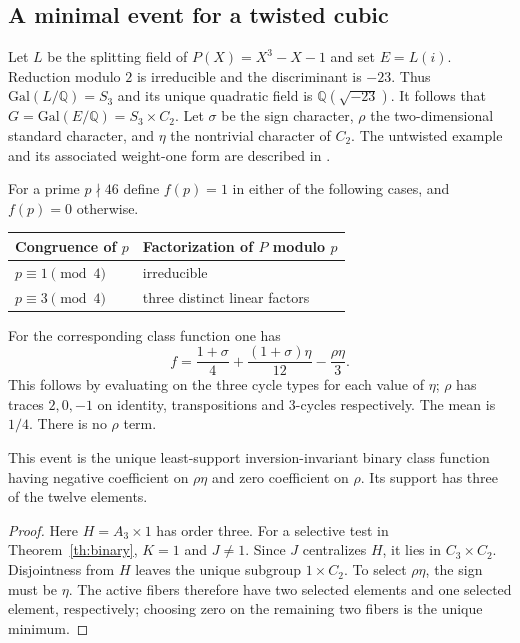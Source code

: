 \subsection{A minimal event for a twisted cubic}
Let $L$ be the splitting field of $P(X)=X^3-X-1$ and set $E=L(i)$. Reduction modulo $2$ is irreducible and the discriminant is $-23$. Thus $\mathrm{Gal}(L/\mathbb Q)=S_3$ and its unique quadratic field is $\mathbb Q(\sqrt{-23})$. It follows that $G=\mathrm{Gal}(E/\mathbb Q)=S_3\times C_2$. Let $\sigma$ be the sign character, $\rho$ the two-dimensional standard character, and $\eta$ the nontrivial character of $C_2$. The untwisted example and its associated weight-one form are described in \cite{serrepoly,ng}.

For a prime $p\nmid46$ define $f(p)=1$ in either of the following cases, and $f(p)=0$ otherwise.
\begin{center}
\begin{tabular}{@{}ll@{}}\toprule
Congruence of $p$ & Factorization of $P$ modulo $p$ \\\midrule
$p\equiv1\pmod4$ & irreducible \\
$p\equiv3\pmod4$ & three distinct linear factors \\\bottomrule
\end{tabular}
\end{center}
For the corresponding class function one has
\begin{equation}\label{eq:identity}
          f=\frac{1+\sigma}{4}+\frac{(1+\sigma)\eta}{12}
                      -\frac{\rho\eta}{3}.
\end{equation}
This follows by evaluating on the three cycle types for each value of $\eta$; $\rho$ has traces $2,0,-1$ on identity, transpositions and 3-cycles respectively. The mean is $1/4$. There is no $\rho$ term.

\begin{corollary}
This event is the unique least-support inversion-invariant binary class function having negative coefficient on $\rho\eta$ and zero coefficient on $\rho$. Its support has three of the twelve elements.
\end{corollary}
\begin{proof}
Here $H=A_3\times1$ has order three. For a selective test in Theorem~\ref{th:binary}, $K=1$ and $J\ne1$. Since $J$ centralizes $H$, it lies in $C_3\times C_2$. Disjointness from $H$ leaves the unique subgroup $1\times C_2$. To select $\rho\eta$, the sign must be $\eta$. The active fibers therefore have two selected elements and one selected element, respectively; choosing zero on the remaining two fibers is the unique minimum.
\end{proof}

